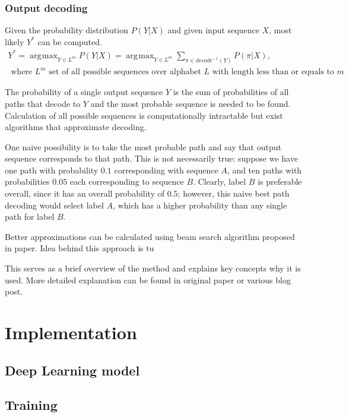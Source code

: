 \documentclass[times, utf8, diplomski, numeric, english]{fer}
\DeclareMathOperator*{\argmax}{\arg\!\max}
\begin{document}
\subsection{Output decoding}
Given the probability distribution $P(Y | X)$ and given input sequence $X$, most likely $Y^{*}$ can be computed.
\begin{gather*}
Y^{*} = \argmax_{Y \in L^m} P(Y|X) = \argmax_{Y \in L^m} \sum_{\pi \in decode^{-1}(Y)}^{} P(\pi | X),\\
\text{~where $L^m$ set of all possible sequences over alphabet $L$ with length less than or equals to $m$}
\end{gather*}

The probability of a single output sequence $Y$ is the sum of probabilities of all paths that decode to $Y$ and the most probable sequence is needed to be found.
Calculation of all possible sequences is computationally intractable but exist algorithms that approximate decoding. 

One naive possibility is to take the most probable path and say that output sequence corresponds to that path.
This is not necessarily true: suppose we have one path with probability $0.1$ corresponding with sequence $A$, and ten paths with probabilities  $0.05$ each corresponding to sequence $B$. Clearly, label $B$ is preferable overall, since it has an overall probability of $0.5$; however, this naive best path decoding would select label $A$, which has a higher probability than any single path for label $B$.

Better approximations can be calculated using beam search algorithm proposed in paper\cite{Graves:2006:CTC:1143844.1143891}.  
Idea behind this approach is tu 

This serves as a brief overview of the method and explains key concepts why it is used. More detailed explanation can be found in original paper\cite{Graves:2006:CTC:1143844.1143891} or various blog post\cite{ctc-blog}.
\chapter{Implementation}
\section{Deep Learning model}
\section{Training}
\end{document}
